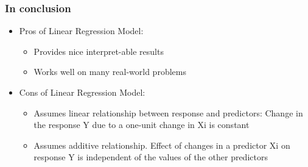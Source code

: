 %




\begin{frame}[fragile]\frametitle{In conclusion}
\begin{itemize}
\item Pros of Linear Regression Model: 
	\begin{itemize}
	\item Provides nice interpret-able results
	\item Works well on many real-world problems
	\end{itemize}
\item Cons of Linear Regression Model:
	\begin{itemize}
	\item Assumes linear relationship between response and predictors: Change in the response Y due to a one-unit change in Xi is constant
	\item Assumes additive relationship. Effect of changes in a predictor Xi on response Y is independent of the values of the other predictors
	\end{itemize}
\end{itemize}
\end{frame}
